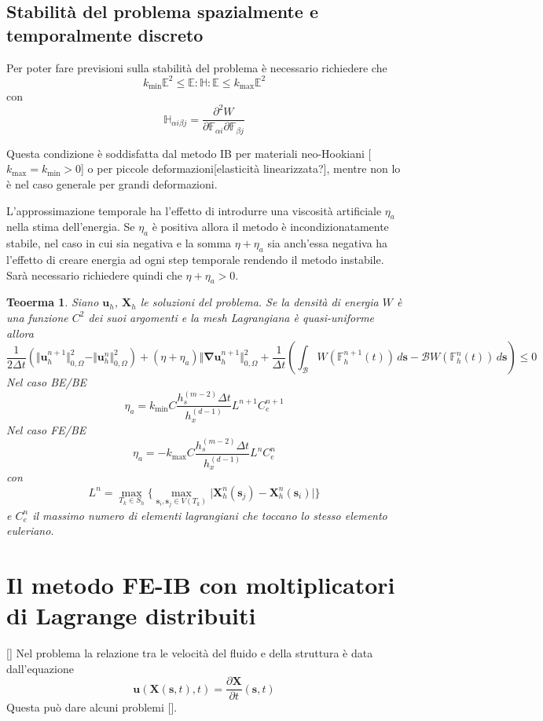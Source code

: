 \documentclass{book}
\newtheorem{theorem}{Teoerma}[section]
\newenvironment{proof}[1][Dimostrazione]{\begin{trivlist}
\item[\hskip \labelsep {\bfseries #1}]}{\end{trivlist}}
\newcommand{\Nabla}{\boldsymbol{\nabla}}
\begin{document}
\subsection{Stabilità del problema spazialmente e temporalmente discreto}

Per poter fare previsioni sulla stabilità del problema è necessario richiedere che
$${k}_\text{min}\mathbb{E}^2\leq\mathbb{E}\mathbf{:}\mathbb{H}\mathbf{:}\mathbb{E}\leq{k}_\text{max}\mathbb{E}^2$$
con
$$\mathbb{H}_{\alpha i\beta j}=\frac{\partial^2 W}{\partial\mathbb{F}_{\alpha i}\partial\mathbb{F}_{\beta j}}$$

Questa condizione è soddisfatta dal metodo IB per materiali neo-Hookiani [${k}_\text{max}={k}_\text{min}>0$] o per piccole deformazioni[elasticità linearizzata?], mentre non lo è nel caso generale per grandi deformazioni.

L'approssimazione temporale ha l'effetto di introdurre una viscosità artificiale $\eta_a$ nella stima dell'energia. Se $\eta_a$ è positiva allora il metodo è incondizionatamente stabile, nel caso in cui sia negativa e la somma $\eta+\eta_a$ sia anch'essa negativa ha l'effetto di creare energia ad ogni step temporale rendendo il metodo instabile. Sarà necessario richiedere quindi che $\eta+\eta_a>0$.

\begin{theorem}
Siano $\mathbf{u}_h$, $\mathbf{X}_h$ le soluzioni del problema. Se la densità di energia $W$ è una funzione $C^2$ dei suoi argomenti e la mesh Lagrangiana è quasi-uniforme allora
$$\frac{1}{2\Delta t}(\Vert\mathbf{u}^{n+1}_h\Vert^2_{0,\Omega}-\Vert\mathbf{u}^{n}_h\Vert^2_{0,\Omega})+(\eta+\eta_a)\Vert\Nabla\mathbf{u}^{n+1}_h\Vert^2_{0,\Omega}+\frac{1}{\Delta t}(\int_{\mathcal{B}}W(\mathbb{F}^{n+1}_h(t))\,d\mathbf{s}-\mathcal{B}W(\mathbb{F}^{n}_h(t))\,d\mathbf{s})\leq 0$$
Nel caso BE/BE
$$\eta_a=k_\text{min}C\frac{h_s^{(m-2)}\Delta t}{h_x^{(d-1)}}L^{n+1}C_e^{n+1}$$
Nel caso FE/BE
$$\eta_a=-k_\text{max}C\frac{h_s^{(m-2)}\Delta t}{h_x^{(d-1)}}L^nC_e^n$$
con $$L^n=\max_{T_k\in S_h} \{ \max_{\mathbf{s}_i,\mathbf{s}_j\in V(T_k)} \vert \mathbf{X}^n_h(\mathbf{s}_j) - \mathbf{X}^n_h(\mathbf{s}_i) \vert \}$$
e $C_e^n$ il massimo numero di elementi lagrangiani che toccano lo stesso elemento euleriano.
\end{theorem}
\begin{proof}
\end{proof}

\section{Il metodo FE-IB con moltiplicatori di Lagrange distribuiti}
[]
Nel problema la relazione tra le velocità  del fluido e della struttura è data dall'equazione
$$\mathbf{u}(\mathbf{X}(\mathbf{s},t),t)=\frac{\partial \mathbf{X}}{\partial t}(\mathbf{s},t)$$
Questa può dare alcuni problemi [].
\end{document}
